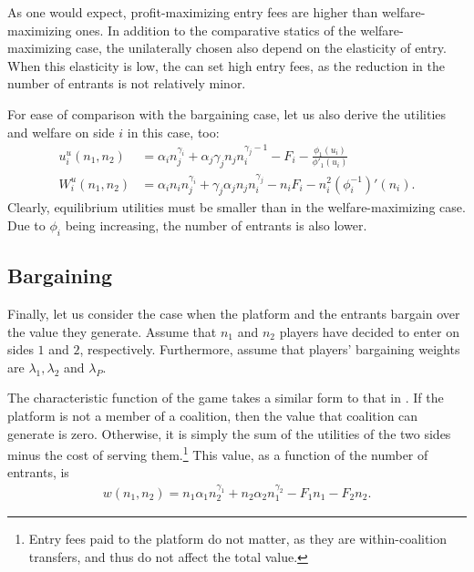 \documentclass[a4paper]{article}
\begin{document}
As one would expect, profit-maximizing entry fees are higher than welfare-maximizing ones.
In addition to the comparative statics of the welfare-maximizing case, the unilaterally chosen also depend on the elasticity of entry.
When this elasticity is low, the can set high entry fees, as the reduction in the number of entrants is not relatively minor.

For ease of comparison with the bargaining case, let us also derive the utilities and welfare on side $i$ in this case, too:
\begin{align*}
    u_i^u(n_1, n_2) &= \alpha_i n_j ^ {\gamma_i} + \alpha_j \gamma_j n_j n_i^{\gamma_j - 1} - F_i - \frac{\phi_1(u_i)}{\phi'_1(u_i)} \\
    W_i^u(n_1, n_2) &= \alpha_i n_i n_j ^ {\gamma_i} + \gamma_j \alpha_j n_j n_i^{\gamma_j} - n_i F_i - n_i^2 (\phi_i^{-1})'(n_i).
\end{align*}
Clearly, equilibrium utilities must be smaller than in the welfare-maximizing case.
Due to $\phi_i$ being increasing, the number of entrants is also lower.

\subsection{Bargaining}

Finally, let us consider the case when the platform and the entrants bargain over the value they generate.
Assume that $n_1$ and $n_2$ players have decided to enter on sides $1$ and $2$, respectively.
Furthermore, assume that players' bargaining weights are $\lambda_1, \lambda_2$ and $\lambda_P$.

The characteristic function of the game takes a similar form to that in .
If the platform is not a member of a coalition, then the value that coalition can generate is zero.
Otherwise, it is simply the sum of the utilities of the two sides minus the cost of serving them.\footnote{
    Entry fees paid to the platform do not matter, as they are within-coalition transfers, and thus do not affect the total value.
}
This value, as a function of the number of entrants, is
\begin{align*}
    w(n_1, n_2) = n_1 \alpha_1 n_2^{\gamma_1} + n_2 \alpha_2 n_1^{\gamma_2} - F_1 n_1 - F_2 n_2.
\end{align*}
\end{document}
